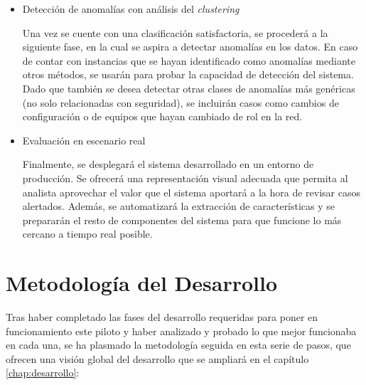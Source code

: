 \begin{itemize}
    \item Detección de anomalías con análisis del \emph{clustering}

Una vez se cuente con una clasificación satisfactoria, se procederá a la siguiente fase, en la cual se aspira a detectar anomalías en los datos.
En caso de contar con instancias que se hayan identificado como anomalías mediante otros métodos, se usarán para probar la capacidad de detección del sistema.
Dado que también se desea detectar otras clases de anomalías más genéricas (no solo relacionadas con seguridad), se incluirán casos como cambios de configuración o de equipos que hayan cambiado de rol en la red.

    \item Evaluación en escenario real

Finalmente, se desplegará el sistema desarrollado en un entorno de producción.
Se ofrecerá una representación visual adecuada que permita al analista aprovechar el valor que el sistema aportará a la hora de revisar casos alertados.
Además, se automatizará la extracción de características y se prepararán el resto de componentes del sistema para que funcione lo más cercano a tiempo real posible.

\end{itemize}

\section{Metodología del Desarrollo}\label{sec:metodologiadesarrollo}

Tras haber completado las fases del desarrollo requeridas para poner en funcionamiento este piloto y haber analizado y probado lo que mejor funcionaba en cada una,
se ha plasmado la metodología seguida en esta serie de pasos, que ofrecen una visión global del desarrollo que se ampliará en el capítulo \ref{chap:desarrollo}:

